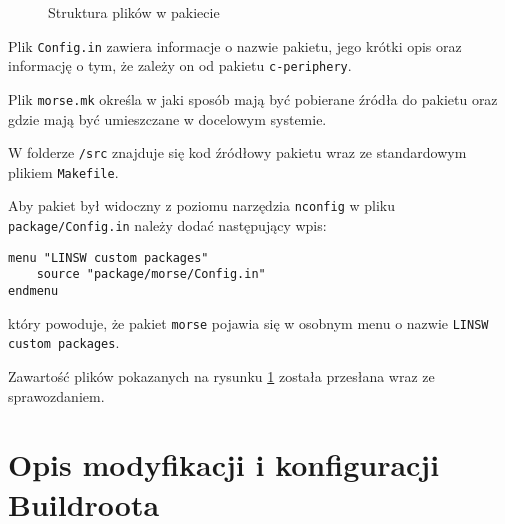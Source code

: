 \documentclass{article}
\begin{document}
\begin{figure}[H]
    \caption{Struktura plików w pakiecie}
    \label{fig:tree}
\end{figure}

Plik \texttt{Config.in} zawiera informacje o nazwie pakietu, jego krótki opis oraz informację o tym, że zależy on od pakietu \texttt{c-periphery}. 

Plik \texttt{morse.mk} określa w jaki sposób mają być pobierane źródła do pakietu oraz gdzie mają być umieszczane w docelowym systemie.

W folderze \texttt{/src} znajduje się kod źródłowy pakietu wraz ze standardowym plikiem \texttt{Makefile}.

Aby pakiet był widoczny z poziomu narzędzia \texttt{nconfig} w pliku \texttt{package/Config.in} należy dodać następujący wpis:

\begin{verbatim}
menu "LINSW custom packages"
    source "package/morse/Config.in"
endmenu
\end{verbatim}

który powoduje, że pakiet \texttt{morse} pojawia się w osobnym menu o nazwie \texttt{LINSW custom packages}.

Zawartość plików pokazanych na rysunku \ref{fig:tree} została przesłana wraz ze sprawozdaniem.

\section{Opis modyfikacji i konfiguracji Buildroota}
\end{document}
